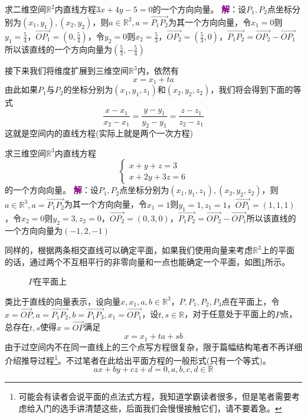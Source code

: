 \begin{example}
	求二维空间$\mathbb{R}^2$内直线方程$3x+4y-5=0$的一个方向向量。
	\tcblower
	\textcolor{purple}{\textbf{解}}：设$P_1,P_2$点坐标分别为$(x_1,y_1),(x_2,y_2)$，则$a\in \mathbb{R}^2,a=\overrightarrow{P_1P_2}$为其一个方向向量，令$x_1=0$则$\displaystyle y_1=\frac{5}{4}$，$\displaystyle \overrightarrow{OP_1}=\left( 0,\frac{5}{4} \right)$，令$y_2=0$则$\displaystyle x_2=\frac{5}{3}$，$\displaystyle \overrightarrow{OP_2}=\left(\frac{5}{3},0\right)$，$\overrightarrow{P_1P_2}=\overrightarrow{OP_2}-\overrightarrow{OP_1}$所以该直线的一个方向向量为$\displaystyle \left( \frac{5}{3},-\frac{5}{4} \right) $
\end{example}

接下来我们将维度扩展到三维空间$\mathbb{R}^3$内，依然有$$x=x_1+ta$$由此如果$P_1$与$P_2$的坐标分别为$(x_1,y_1,z_1)$和$(x_2,y_2,z_2)$，我们将会得到下面的等式$$\frac{x-x_1}{x_2-x_1}=\frac{y-y_1}{y_2-y_1}=\frac{z-z_1}{z_2-z_1}$$这就是空间内的直线方程(实际上就是两个一次方程)

\begin{example}
	求三维空间$\mathbb{R}^3$内直线方程$$\left\{\begin{matrix} 
		x+y+z=3 \\  
		x+2y+3z=6
	\end{matrix}\right. $$的一个方向向量。
	\tcblower
	\textcolor{purple}{\textbf{解}}：设$P_1,P_2$点坐标分别为$(x_1,y_1,z_1),(x_2,y_2,z_2)$，则$a\in \mathbb{R}^3,a=\overrightarrow{P_1P_2}$为其一个方向向量，令$x_1=1$则$\displaystyle y_1=1,z_1=1$，$\displaystyle \overrightarrow{OP_1}=\left( 1,1,1 \right)$，令$x_2=0$则$\displaystyle y_2=3,z_2=0$，$\displaystyle \overrightarrow{OP_2}=\left(0,3,0\right)$，$\overrightarrow{P_1P_2}=\overrightarrow{OP_2}-\overrightarrow{OP_1}$所以该直线的一个方向向量为$\displaystyle \left( -1,2,-1 \right) $
\end{example}

同样的，根据两条相交直线可以确定平面，如果我们使用向量来考虑$\mathbb{R}^3$上的平面的话，通过两个不互相平行的非零向量和一点也能确定一个平面，如图\ref{tikz:space.face}所示。

\begin{figure}[htbp]
	\centering
	
	\caption{$P$在平面上}
	\label{tikz:space.face}
\end{figure}

类比于直线的向量表示，设向量$x,x_1,a,b\in \mathbb{R}^3$，$P,P_1,P_2,P_3$点在平面上，令$x=\overrightarrow{OP},a=\overrightarrow{P_1P_2},b=\overrightarrow{P_1P_3},x_1=\overrightarrow{OP_1}$，设$t,s\in \mathbb{R}$，对于任意处于平面上的$P$点，总存在$t,s$使得$x=\overrightarrow{OP}$满足$$x=x_1+ta+sb$$由于过空间内不在同一直线上的三个点写方程很复杂，限于篇幅结构笔者不再详细介绍推导过程\footnote{可能会有读者会说平面的点法式方程，我知道学霸读者很多，但是笔者需要考虑给入门的选手讲清楚这些，后面我们会慢慢接触它们，请不要着急。}。不过笔者在此给出平面方程的一般形式(只有一个等式)。$$ax+by+cz+d=0,a,b,c,d\in \mathbb{R}$$

